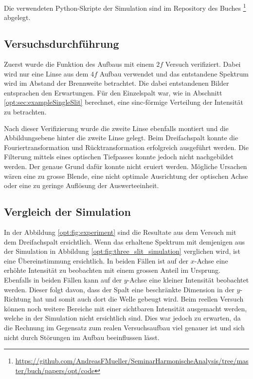 Die verwendeten Python-Skripte der Simulation sind im Repository des Buches 
\footnote{\url{https://github.com/AndreasFMueller/SeminarHarmonischeAnalysis/tree/master/buch/papers/opt/code}}
abgelegt.

\subsection{Versuchsdurchführung}
Zuerst wurde die Funktion des Aufbaus mit einem $2f$ Versuch verifiziert.
Dabei wird nur eine Linse aus dem $4f$ Aufbau verwendet und das entstandene Spektrum wird im Abstand der Brennweite betrachtet.
Die dabei entstandenen Bilder entsprachen den Erwartungen.
Für den Einzelspalt war, wie in Abschnitt \ref{opt:sec:exampleSingleSlit} berechnet, eine sinc-förmige Verteilung der Intensität zu betrachten.

Nach dieser Verifizierung wurde die zweite Linse ebenfalls montiert und die Abbildungsebene hinter die zweite Linse gelegt.
Beim Dreifachspalt konnte die Fouriertransformation und Rücktransformation erfolgreich ausgeführt werden.
Die Filterung mittels eines optischen Tiefpasses konnte jedoch nicht nachgebildet werden.
Der genaue Grund dafür konnte nicht eruiert werden.
Mögliche Ursachen wären eine zu grosse Blende, eine nicht optimale Ausrichtung der optischen Achse oder eine zu geringe Auflösung der Auswerteeinheit.

\subsection{Vergleich der Simulation}
In der Abbildung \ref{opt:fig:experiment} sind die Resultate aus dem Versuch mit dem Dreifachspalt ersichtlich.
Wenn das erhaltene Spektrum mit demjenigen aus der Simulation in Abbildung \ref{opt:fig:three_slit_simulation} verglichen wird, ist eine Übereinstimmung ersichtlich.
In beiden Fällen ist auf der $x$-Achse eine erhöhte Intensität zu beobachten mit einem grossen Anteil im Ursprung.
Ebenfalls in beiden Fällen kann auf der $y$-Achse eine kleiner Intensität beobachtet werden.
Dieser folgt davon, dass der Spalt eine beschränkte Dimension in der $y$-Richtung hat und somit auch dort die Welle gebeugt wird.
Beim reellen Versuch können noch weitere Bereiche mit einer sichtbaren Intensität ausgemacht werden, welche in der Simulation nicht ersichtlich sind.
Dies war jedoch zu erwarten, da die Rechnung im Gegensatz zum realen Versuchsaufbau viel genauer ist und sich nicht durch Störungen im Aufbau beeinflussen lässt.


